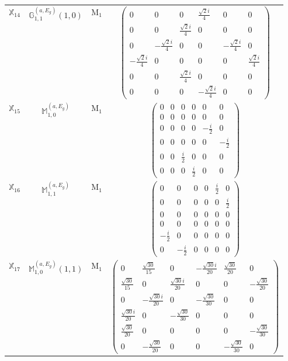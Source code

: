 \documentclass[fleqn,10pt,landscape]{article}
\begin{document}
\begin{itemize}
\begin{center}
\begin{longtable}{c|c|c|c}
$ \mathbb{X}_{14} $ & $\mathbb{G}_{1,1}^{(a,E_{g})}(1,0)$ & M$_{1}$ & $\begin{pmatrix} 0 & 0 & 0 & \frac{\sqrt{2} i}{4} & 0 & 0 \\ 0 & 0 & \frac{\sqrt{2} i}{4} & 0 & 0 & 0 \\ 0 & - \frac{\sqrt{2} i}{4} & 0 & 0 & - \frac{\sqrt{2} i}{4} & 0 \\ - \frac{\sqrt{2} i}{4} & 0 & 0 & 0 & 0 & \frac{\sqrt{2} i}{4} \\ 0 & 0 & \frac{\sqrt{2} i}{4} & 0 & 0 & 0 \\ 0 & 0 & 0 & - \frac{\sqrt{2} i}{4} & 0 & 0 \end{pmatrix}$ \\
$ \mathbb{X}_{15} $ & $\mathbb{M}_{1,0}^{(a,E_{g})}$ & M$_{1}$ & $\begin{pmatrix} 0 & 0 & 0 & 0 & 0 & 0 \\ 0 & 0 & 0 & 0 & 0 & 0 \\ 0 & 0 & 0 & 0 & - \frac{i}{2} & 0 \\ 0 & 0 & 0 & 0 & 0 & - \frac{i}{2} \\ 0 & 0 & \frac{i}{2} & 0 & 0 & 0 \\ 0 & 0 & 0 & \frac{i}{2} & 0 & 0 \end{pmatrix}$ \\
$ \mathbb{X}_{16} $ & $\mathbb{M}_{1,1}^{(a,E_{g})}$ & M$_{1}$ & $\begin{pmatrix} 0 & 0 & 0 & 0 & \frac{i}{2} & 0 \\ 0 & 0 & 0 & 0 & 0 & \frac{i}{2} \\ 0 & 0 & 0 & 0 & 0 & 0 \\ 0 & 0 & 0 & 0 & 0 & 0 \\ - \frac{i}{2} & 0 & 0 & 0 & 0 & 0 \\ 0 & - \frac{i}{2} & 0 & 0 & 0 & 0 \end{pmatrix}$ \\
$ \mathbb{X}_{17} $ & $\mathbb{M}_{1,0}^{(a,E_{g})}(1,1)$ & M$_{1}$ & $\begin{pmatrix} 0 & \frac{\sqrt{30}}{15} & 0 & - \frac{\sqrt{30} i}{20} & \frac{\sqrt{30}}{20} & 0 \\ \frac{\sqrt{30}}{15} & 0 & \frac{\sqrt{30} i}{20} & 0 & 0 & - \frac{\sqrt{30}}{20} \\ 0 & - \frac{\sqrt{30} i}{20} & 0 & - \frac{\sqrt{30}}{30} & 0 & 0 \\ \frac{\sqrt{30} i}{20} & 0 & - \frac{\sqrt{30}}{30} & 0 & 0 & 0 \\ \frac{\sqrt{30}}{20} & 0 & 0 & 0 & 0 & - \frac{\sqrt{30}}{30} \\ 0 & - \frac{\sqrt{30}}{20} & 0 & 0 & - \frac{\sqrt{30}}{30} & 0 \end{pmatrix}$ \\

\end{longtable}
\end{center}
\end{itemize}
\end{document}
